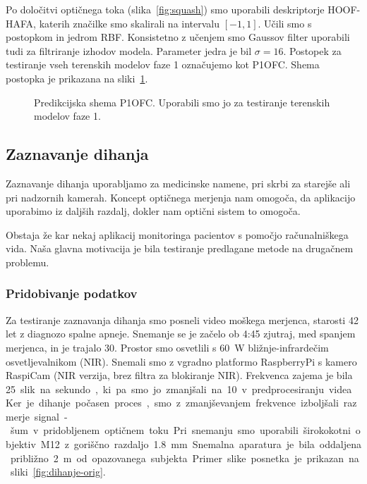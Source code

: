 Po določitvi optičnega toka (slika~\ref{fig:squash}) smo uporabili deskriptorje HOOF-HAFA, katerih značilke smo skalirali na intervalu $[-1,1]$. Učili smo s postopkom \esvr in jedrom RBF. Konsistetno z učenjem smo Gaussov filter uporabili tudi za filtriranje izhodov modela. Parameter jedra je bil $\sigma=16$. Postopek za testiranje vseh terenskih modelov faze 1 označujemo kot P1OFC. Shema postopka je prikazana na sliki~\ref{fig:diagram-procesiranja-field-stage1}.

\begin{figure}[!htb]
	\centering
	\resizebox{\columnwidth}{!}{}
	\caption[Predikcijska shema P1OFC]{Predikcijska shema P1OFC. Uporabili smo jo za testiranje terenskih modelov faze 1.}
	\label{fig:diagram-procesiranja-field-stage1}
\end{figure}

















\subsection{Zaznavanje dihanja}
Zaznavanje dihanja uporabljamo za medicinske namene, pri skrbi za starejše ali pri nadzornih kamerah. Koncept optičnega merjenja nam omogoča, da aplikacijo uporabimo iz daljših razdalj, dokler nam optični sistem to omogoča. 

Obstaja že kar nekaj aplikacij monitoringa pacientov s pomočjo računalniškega vida. Naša glavna motivacija je bila testiranje predlagane metode na drugačnem problemu.

\subsubsection{Pridobivanje podatkov}
Za testiranje zaznavanja dihanja smo posneli video moškega merjenca, starosti 42 let z diagnozo spalne apneje. Snemanje se je začelo ob 4:45 zjutraj, med spanjem merjenca, in je trajalo \SI{30}{\min}. Prostor smo osvetlili s \SI{60}{\W} bližnje-infrardečim osvetljevalnikom (NIR). Snemali smo z vgradno platformo RaspberryPi s kamero RaspiCam (NIR verzija, brez filtra za blokiranje NIR). Frekvenca zajema je bila \SI{25} slik na sekundo, ki pa smo jo zmanjšali na \SI{10} v predprocesiranju videa. Ker je dihanje počasen proces, smo z zmanjševanjem frekvence izboljšali razmerje signal-šum v pridobljenem optičnem toku. Pri snemanju smo uporabili širokokotni objektiv M12 z goriščno razdaljo \SI{1.8}{mm}. Snemalna aparatura je bila oddaljena približno \SI{2}{m} od opazovanega subjekta. Primer slike posnetka je prikazan na sliki~\ref{fig:dihanje-orig}.

